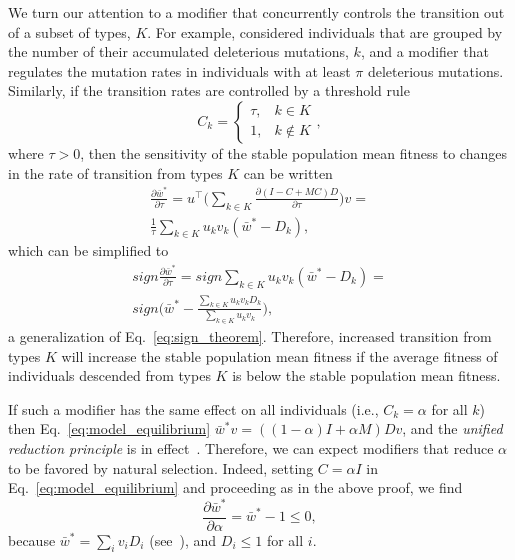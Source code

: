 \documentclass[9pt, a4paper, twocolumn]{extarticle}
\newcommand*{\tr}{^\intercal}
\begin{document}
We turn our attention to a modifier that concurrently controls the transition out of a subset of types, $K$.
For example, \citet[Appendix~B]{Ram2012} considered individuals that are grouped by the number of their accumulated deleterious mutations, $k$, and a modifier that regulates the mutation rates in individuals with at least $\pi$ deleterious mutations.
Similarly, if the transition rates are controlled by a threshold rule 
\begin{equation}
C_k = \begin{cases}
\tau, & k \in K \\
1, & k \not\in K
\end{cases},
\end{equation}
where $\tau > 0$, then the sensitivity of the stable population mean fitness to changes in the
rate of transition from types $K$ can be written 
\begin{equation}
\begin{aligned}
\frac{\partial \bar{w}^*}{\partial \tau} = 
u\tr \Big( \sum_{k \in K}{\frac{\partial (I - C + MC)D}{\partial \tau}} \Big) v = \\
\frac{1}{\tau} \sum_{k \in K}{u_k v_k (\bar{w}^* - D_k)},
\end{aligned}
\end{equation}
which can be simplified to
\begin{multline}\label{eq:sign_theorem_threshold}
sign \frac{\partial \bar{w}^*}{\partial \tau} = 
sign \sum_{k \in K}{u_k v_k (\bar{w}^* - D_k)} = \\ 
sign \Big(\bar{w}^* - \frac{\sum_{k \in K}{u_k v_k D_k}}{\sum_{k \in K}{u_k v_k}}\Big), 
\end{multline}
a generalization of Eq.~\ref{eq:sign_theorem}.
Therefore, increased transition from types $K$ will increase the stable population mean fitness if the average fitness of individuals descended from types $K$ is below the stable population mean fitness.

If such a modifier has the same effect on all individuals (i.e., $C_k = \alpha$ for all $k$) then Eq.~\ref{eq:model_equilibrium} $\bar{w}^* v = ((1-\alpha)I + \alpha M)Dv$,
and the \emph{unified reduction principle} is in effect~\cite[eqs. 65, 72]{Altenberg2017}.
Therefore, we can expect modifiers that reduce $\alpha$ to be favored by natural selection.
Indeed, setting $C = \alpha I$ in Eq.~\ref{eq:model_equilibrium} and proceeding as in the above proof, we find
$$
\frac{\partial \bar{w}^*}{\partial \alpha} = 
\bar{w}^* - 1 \le 0,
$$
because $\bar{w}^* = \sum_i{v_i D_i}$ (see~), and $D_i \le 1$ for all $i$.
\end{document}

